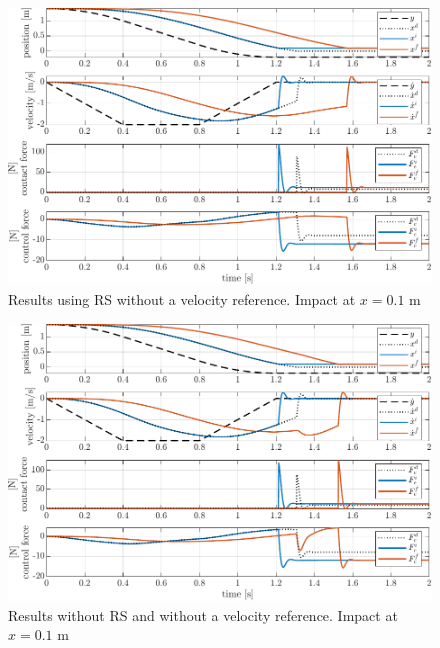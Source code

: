 \documentclass[11pt]{report}
\numberwithin{equation}{section}        %
\numberwithin{figure}{section}          %
\numberwithin{table}{section}           %
\begin{document}
  \newpage
  \begin{figure}[!h]
  \centering
  \begin{adjustwidth}{0pt}{5pt}
  \includegraphics[right]{Graphics/1d_learned_w=0.1_novel.pdf}
  \end{adjustwidth}
  \caption{Results using RS without a velocity reference. Impact at $x=0.1$ m}
  \label{fig:1d_learned_w01_novel}
  \end{figure}

  \begin{figure}[!h]
  \centering
  \begin{adjustwidth}{0pt}{5pt}
  \includegraphics[right]{Graphics/1d_learned_w=0.1_novel_nors.pdf}
  \end{adjustwidth}
  \caption{Results without RS and without a velocity reference. Impact at $x=0.1$ m}
  \label{fig:1d_learned_w01_novel_nors}
  \end{figure}
\end{document}
